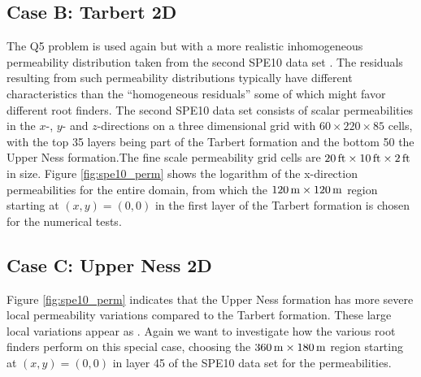 \subsection{Case B: Tarbert 2D}
\label{section:caseB}
The Q5 problem is used again but with a more realistic inhomogeneous permeability distribution taken from the second SPE10 data set \citep{spe10_2000}. The residuals resulting from such permeability distributions typically have different characteristics than the ``homogeneous residuals'' some of which might favor different root finders. The second SPE10 data set consists of scalar permeabilities in the $x$-, $y$- and $z$-directions on a three dimensional grid with $60\times 220\times 85$ cells, with the top 35 layers being part of the Tarbert formation and the bottom 50 the Upper Ness formation.The fine scale permeability grid cells are $\unit[20]{ft}\times \unit[10]{ft}\times \unit[2]{ft}$ in size. Figure \ref{fig:spe10_perm} shows the logarithm of the x-direction permeabilities for the entire domain, from which the $\unit[120]{m}\times \unit[120]{m}$ region starting at $(x,y) = (0,0)$ in the first layer of the Tarbert formation is chosen for the numerical tests.






\clearpage
\subsection{Case C: Upper Ness 2D}
\label{section:caseC}
Figure \ref{fig:spe10_perm} indicates that the Upper Ness formation has more severe local permeability variations compared to the Tarbert formation. These large local variations appear as . Again we want to investigate how the various root finders perform on this special case, choosing the $\unit[360]{m}\times \unit[180]{m}$ region starting at $(x,y) = (0,0)$ in layer 45 of the SPE10 data set for the permeabilities.






\clearpage
